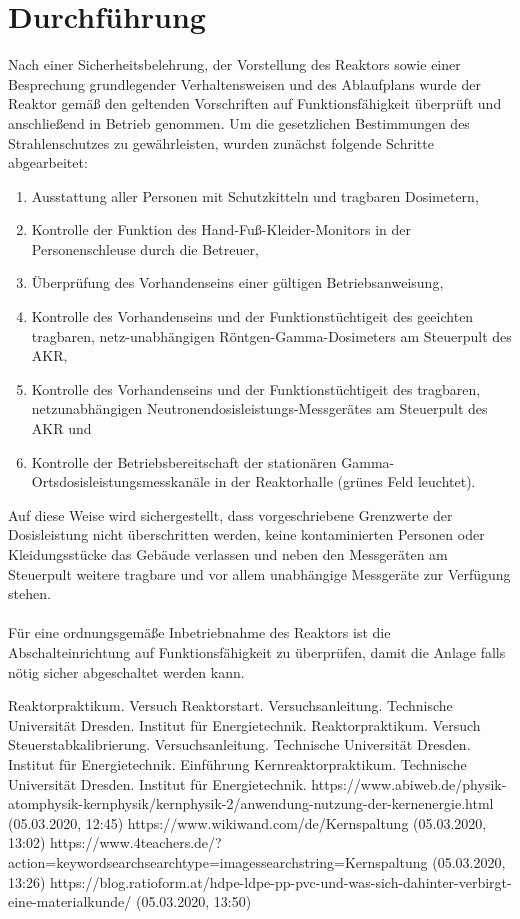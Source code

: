 \documentclass[german,  %
parskip=full,  %
]{scrartcl}
\begin{document}
\section{Durchführung}
Nach einer Sicherheitsbelehrung, der Vorstellung des Reaktors sowie einer Besprechung grundlegender Verhaltensweisen und des Ablaufplans wurde der Reaktor gemäß den geltenden Vorschriften auf Funktionsfähigkeit überprüft und anschließend in Betrieb genommen. Um die gesetzlichen Bestimmungen des Strahlenschutzes zu gewährleisten, wurden zunächst folgende Schritte abgearbeitet:
\begin{enumerate}
\item Ausstattung aller Personen mit Schutzkitteln und tragbaren Dosimetern,
\item Kontrolle der Funktion des Hand-Fuß-Kleider-Monitors in der Personenschleuse durch die Betreuer,
\item Überprüfung des Vorhandenseins einer gültigen Betriebsanweisung,
\item Kontrolle des Vorhandenseins und der Funktionstüchtigeit des geeichten tragbaren, netz-unabhängigen Röntgen-Gamma-Dosimeters am Steuerpult des AKR,
\item Kontrolle des Vorhandenseins und der Funktionstüchtigeit des tragbaren, netzunabhängigen Neutronendosisleistungs-Messgerätes am Steuerpult des AKR und
\item Kontrolle der Betriebsbereitschaft der stationären Gamma-Ortsdosisleistungsmesskanäle in der Reaktorhalle (grünes Feld leuchtet).
\end{enumerate}
Auf diese Weise wird sichergestellt, dass vorgeschriebene Grenzwerte der Dosisleistung nicht überschritten werden, keine kontaminierten Personen oder Kleidungsstücke das Gebäude verlassen und neben den Messgeräten am Steuerpult weitere tragbare und vor allem unabhängige Messgeräte zur Verfügung stehen. \\\\
Für eine ordnungsgemäße Inbetriebnahme des Reaktors ist die Abschalteinrichtung auf Funktionsfähigkeit zu überprüfen, damit die Anlage falls nötig sicher abgeschaltet werden kann. 
    \begin{thebibliography}{9}
    Reaktorpraktikum. Versuch Reaktorstart. Versuchsanleitung. Technische Universität Dresden. Institut für Energietechnik.
    Reaktorpraktikum. Versuch Steuerstabkalibrierung. Versuchsanleitung. Technische Universität Dresden. Institut für           Energietechnik.
    Einführung Kernreaktorpraktikum. Technische Universität Dresden. Institut für           Energietechnik.
    https://www.abiweb.de/physik-atomphysik-kernphysik/kernphysik-2/anwendung-nutzung-der-kernenergie.html (05.03.2020,      12:45)
   https://www.wikiwand.com/de/Kernspaltung (05.03.2020, 13:02)
  https://www.4teachers.de/?action=keywordsearchsearchtype=imagessearchstring=Kernspaltung (05.03.2020, 13:26)
https://blog.ratioform.at/hdpe-ldpe-pp-pvc-und-was-sich-dahinter-verbirgt-eine-materialkunde/ (05.03.2020, 13:50)


    \end{thebibliography}

\end{document}
